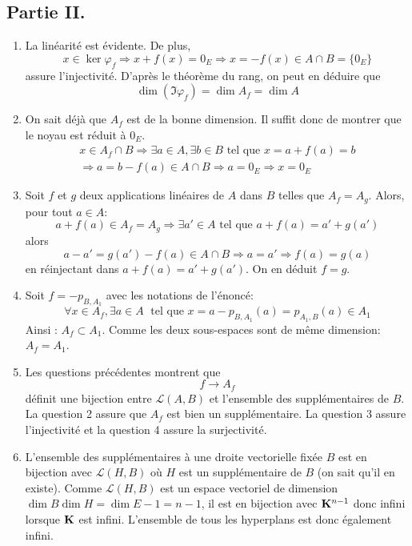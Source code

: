 \subsection*{Partie II.}
\begin{enumerate}
 \item La linéarité est évidente. De plus,
\begin{displaymath}
 x\in \ker \varphi_f \Rightarrow x+f(x)=0_E \Rightarrow x=-f(x)\in A\cap B = \{0_E\} 
\end{displaymath}
assure l'injectivité. D'après le théorème du rang, on peut en déduire que 
\begin{displaymath}
 \dim (\Im \varphi_f) = \dim A_f = \dim A
\end{displaymath}
\item On sait déjà que $A_f$ est de la bonne dimension. Il suffit donc de montrer que le noyau est réduit à $0_E$.
\begin{multline*}
 x\in A_f\cap B \Rightarrow \exists a\in A, \exists b\in B \text{ tel que } x=a+f(a)=b \\
\Rightarrow a=b-f(a)\in A\cap B \Rightarrow a= 0_E \Rightarrow x=0_E
\end{multline*}
\item Soit $f$ et $g$ deux applications linéaires de $A$ dans $B$ telles que $A_f=A_g$. Alors, pour tout $a\in A$:
\begin{displaymath}
 a+f(a)\in A_f=A_g \Rightarrow \exists a'\in A \text{ tel que } a+f(a)=a'+g(a') 
\end{displaymath}
alors
\begin{displaymath}
  a-a' = g(a')-f(a)\in A\cap B \Rightarrow a=a' \Rightarrow f(a)=g(a)
\end{displaymath}
en réinjectant dans $a+f(a)=a'+g(a')$. On en déduit $f=g$.

\item Soit $f=-p_{B,A_1}$ avec les notations de l'énoncé:
\begin{displaymath}
\forall x\in A_f, \exists a\in A\; \text{ tel que } x=a-p_{B,A_1}(a) = p_{A_1,B}(a)\in A_1
\end{displaymath}
Ainsi : $A_f \subset A_1$. Comme les deux sous-espaces sont de même dimension: $A_f = A_1$.
\item Les questions précédentes montrent que 
\begin{displaymath}
 f \rightarrow A_f
\end{displaymath}
définit une bijection entre $\mathcal L(A,B)$ et l'ensemble des supplémentaires de $B$.\newline
La question 2 assure que $A_f$ est bien un supplémentaire. La question 3 assure l'injectivité et la question 4 assure la surjectivité.
\item L'ensemble des supplémentaires à une droite vectorielle fixée $B$ est en bijection avec $\mathcal L(H,B)$ où $H$ est un supplémentaire de $B$ (on sait qu'il en existe). Comme $\mathcal L(H,B)$ est un espace vectoriel de dimension $\dim B \dim H = \dim E -1=n-1$, il est en bijection avec $\mathbf{K}^{n-1}$  donc infini lorsque $\mathbf{K}$ est infini. L'ensemble de tous les hyperplans est donc également infini.


\end{enumerate}
